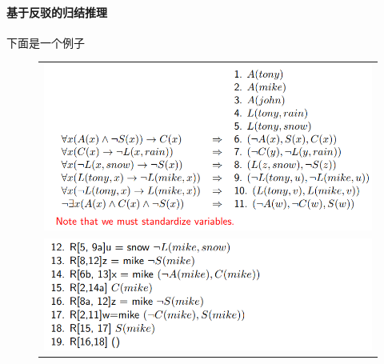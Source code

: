 \paragraph{基于反驳的归结推理}
\begin{example}
下面是一个例子
\begin{figure}[H]
\centering
\begin{tabular}{c}
\includegraphics[width=0.8\linewidth]{fig/alpine_club_eg1.png}\\
\includegraphics[width=0.8\linewidth]{fig/alpine_club_eg2.png}
\end{tabular}
\end{figure}
\end{example}

